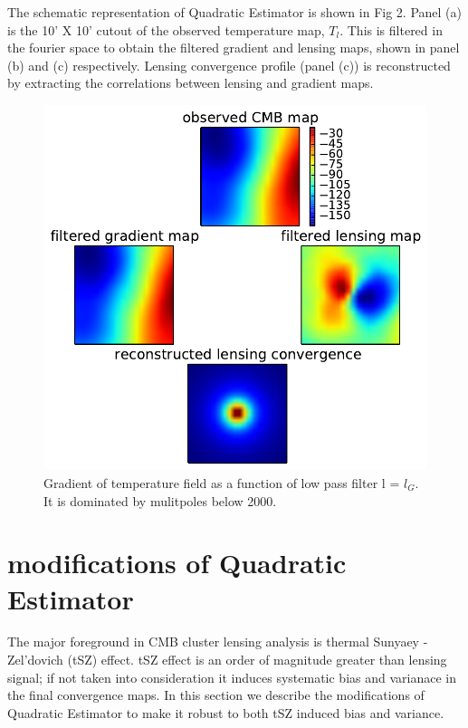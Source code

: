 The schematic representation of Quadratic Estimator is shown in Fig 2. 
Panel (a) is the 10' X 10' cutout of the observed temperature map, $T_{l}$.
This is filtered in the fourier space  to obtain the filtered gradient and lensing maps, shown in panel (b) and (c) respectively.
Lensing convergence profile (panel (c)) is reconstructed by extracting the correlations between lensing and gradient maps.
 \begin{figure}[H]
\includegraphics[width=\linewidth]{figs/schematic_rep.pdf}
\caption{Gradient of temperature field as a function of low pass filter l = $l_{G}$. It is dominated by mulitpoles below 2000. }
\label{fig:gradient_cut}
\end{figure}
 
\section{modifications of Quadratic Estimator}
The major foreground in CMB cluster lensing analysis is thermal Sunyaey -Zel'dovich (tSZ) effect. 
tSZ effect is an order of magnitude greater than lensing signal; if not taken into consideration it induces systematic bias and varianace in the final convergence maps.
In this section we describe the modifications of Quadratic Estimator to make it robust to both tSZ induced bias and variance.

